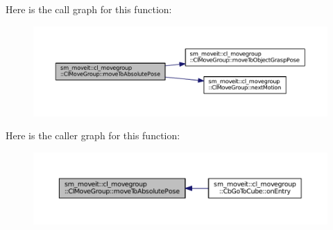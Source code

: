 Here is the call graph for this function\+:
\nopagebreak
\begin{figure}[H]
\begin{center}
\leavevmode
\includegraphics[width=350pt]{classsm__moveit_1_1cl__movegroup_1_1ClMoveGroup_a6b85fe06800db92b08346603e5d2eabb_cgraph}
\end{center}
\end{figure}




Here is the caller graph for this function\+:
\nopagebreak
\begin{figure}[H]
\begin{center}
\leavevmode
\includegraphics[width=350pt]{classsm__moveit_1_1cl__movegroup_1_1ClMoveGroup_a6b85fe06800db92b08346603e5d2eabb_icgraph}
\end{center}
\end{figure}


